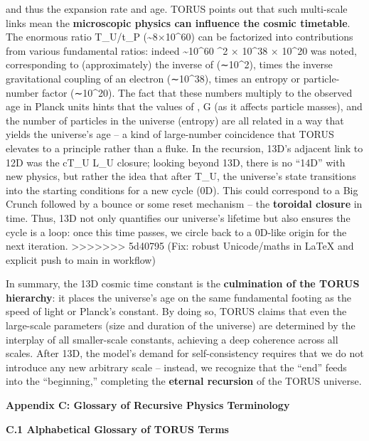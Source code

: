 \documentclass[]{article}
\begin{document}
{and thus the expansion rate and age. TORUS points out that such
multi-scale links mean the \textbf{microscopic physics can influence the
cosmic timetable}. The enormous ratio T\_U/t\_P
(\textasciitilde{}8×10\^{}60) can be factorized into contributions from
various fundamental ratios: indeed \textasciitilde{}10\^{}60 \^{}2 ×
10\^{}38 × 10\^{}20 was noted​, corresponding to (approximately) the
inverse of \alpha (∼10\^{}2), times the inverse gravitational coupling of an
electron (∼10\^{}38), times an entropy or particle-number factor
(∼10\^{}20). The fact that these numbers multiply to the observed age in
Planck units hints that the values of \alpha, G (as it affects particle
masses), and the number of particles in the universe (entropy) are all
related in a way that yields the universe's age -- a kind of
large-number coincidence that TORUS elevates to a principle rather than
a fluke​. In the recursion, 13D's adjacent link to 12D was the cT\_U \approx
L\_U closure; looking beyond 13D, there is no ``14D'' with new physics,
but rather the idea that after T\_U, the universe's state transitions
into the starting conditions for a new cycle (0D)​. This could
correspond to a Big Crunch followed by a bounce or some reset mechanism
-- the \textbf{toroidal closure} in time. Thus, 13D not only quantifies
our universe's lifetime but also ensures the cycle is a loop: once this
time passes, we circle back to a 0D-like origin for the next iteration.
>>>>>>> 5d40795 (Fix: robust Unicode/maths in LaTeX and explicit push to main in workflow)

In summary, the 13D cosmic time constant is the \textbf{culmination of
the TORUS hierarchy}: it places the universe's age on the same
fundamental footing as the speed of light or Planck's constant. By doing
so, TORUS claims that even the large-scale parameters (size and duration
of the universe) are determined by the interplay of all smaller-scale
constants, achieving a deep coherence across all scales. After 13D, the
model's demand for self-consistency requires that we do not introduce
any new arbitrary scale -- instead, we recognize that the ``end'' feeds
into the ``beginning,'' completing the \textbf{eternal recursion} of the
TORUS universe​.

\textbf{Appendix C: Glossary of Recursive Physics Terminology}

\textbf{C.1 Alphabetical Glossary of TORUS Terms}

}
\end{document}
